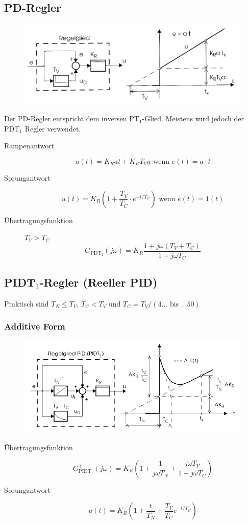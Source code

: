 \subsection{PD-Regler}
\begin{figure}[h!]
	\includegraphics[width=\linewidth]{./images/PD_Regler.png}
\end{figure}
Der PD-Regler entspricht dem inversen PT\(_1\)-Glied. Meistens wird jedoch der PDT\(_1\) Regler verwendet.
\begin{description}
	\item[Rampenantwort]
		\[
			u(t) = K_R at + K_R T_V a \text{ wenn } e(t) = a\cdot t
		\]
	\item[Sprungantwort]
		\[
			u(t) = K_R \left( 1 + \frac{T_V}{T_C} \cdot e^{-t/T_C} \right)
			\text{ wenn } e(t) = 1(t)
		\]
	\item[\"Ubertragungsfunktion] \(T_V > T_C\)
		\[
			G_{\text{PDT}_1}(j\omega) = K_R \frac{1+j\omega(T_V+T_C)}{1+j\omega T_C}
		\]
\end{description}
 

\subsection{PIDT\(_1\)-Regler (Reeller PID) }
Praktisch sind \(T_N \leq T_V\), \(T_C < T_V\) und \(T_C = T_V/(4\ldots \text{ bis }\ldots 50)\)

\subsubsection{Additive Form}
\begin{figure}[h!]
	\includegraphics[width = \linewidth]{./images/PID_Regler_add}
\end{figure}
\begin{description}
	\item[\"Ubertragungsfunktion]
		\[
			G_{\text{PIDT}_1}^{+} (j\omega) = K_R \left(
				1 + \frac{1}{j\omega T_N} + \frac{j\omega T_V}{1 + j\omega T_C}
			\right)
		\]
	\item[Sprungantwort]
		\[
			u(t) = K_R \left( 1 + \frac{t}{T_N} + \frac{T_V}{T_C}e^{-t/T_C} \right)
		\]
\end{description}

